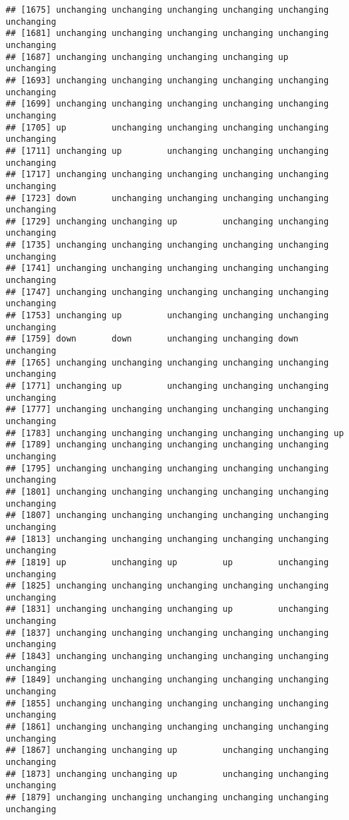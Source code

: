 \documentclass[]{article}
\begin{document}
\begin{verbatim}
## [1675] unchanging unchanging unchanging unchanging unchanging unchanging
## [1681] unchanging unchanging unchanging unchanging unchanging unchanging
## [1687] unchanging unchanging unchanging unchanging up         unchanging
## [1693] unchanging unchanging unchanging unchanging unchanging unchanging
## [1699] unchanging unchanging unchanging unchanging unchanging unchanging
## [1705] up         unchanging unchanging unchanging unchanging unchanging
## [1711] unchanging up         unchanging unchanging unchanging unchanging
## [1717] unchanging unchanging unchanging unchanging unchanging unchanging
## [1723] down       unchanging unchanging unchanging unchanging unchanging
## [1729] unchanging unchanging up         unchanging unchanging unchanging
## [1735] unchanging unchanging unchanging unchanging unchanging unchanging
## [1741] unchanging unchanging unchanging unchanging unchanging unchanging
## [1747] unchanging unchanging unchanging unchanging unchanging unchanging
## [1753] unchanging up         unchanging unchanging unchanging unchanging
## [1759] down       down       unchanging unchanging down       unchanging
## [1765] unchanging unchanging unchanging unchanging unchanging unchanging
## [1771] unchanging up         unchanging unchanging unchanging unchanging
## [1777] unchanging unchanging unchanging unchanging unchanging unchanging
## [1783] unchanging unchanging unchanging unchanging unchanging up        
## [1789] unchanging unchanging unchanging unchanging unchanging unchanging
## [1795] unchanging unchanging unchanging unchanging unchanging unchanging
## [1801] unchanging unchanging unchanging unchanging unchanging unchanging
## [1807] unchanging unchanging unchanging unchanging unchanging unchanging
## [1813] unchanging unchanging unchanging unchanging unchanging unchanging
## [1819] up         unchanging up         up         unchanging unchanging
## [1825] unchanging unchanging unchanging unchanging unchanging unchanging
## [1831] unchanging unchanging unchanging up         unchanging unchanging
## [1837] unchanging unchanging unchanging unchanging unchanging unchanging
## [1843] unchanging unchanging unchanging unchanging unchanging unchanging
## [1849] unchanging unchanging unchanging unchanging unchanging unchanging
## [1855] unchanging unchanging unchanging unchanging unchanging unchanging
## [1861] unchanging unchanging unchanging unchanging unchanging unchanging
## [1867] unchanging unchanging up         unchanging unchanging unchanging
## [1873] unchanging unchanging up         unchanging unchanging unchanging
## [1879] unchanging unchanging unchanging unchanging unchanging unchanging

\end{verbatim}
\end{document}
